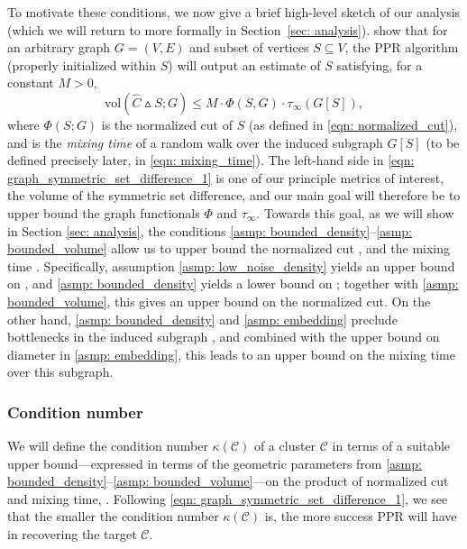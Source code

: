 \documentclass[11pt,twoside]{article}
\theoremstyle{definition}
\newcommand{\vol}{\mathrm{vol}}
\newcommand{\cut}{\mathrm{cut}}
\newcommand{\1}{\mathbbm{1}}
\newcommand{\Xbf}{X}
\newcommand{\Cset}{\mathcal{C}}
\newcommand{\Csig}{\Cset_{\sigma}}
\newcommand{\Cest}{\widehat{C}}
\begin{document}
To motivate these conditions, we now give a brief high-level sketch
of our analysis (which we will return to more formally in Section~\ref{sec:  
  analysis}).  \citet{zhu2013} show that for an arbitrary graph $G = (V,E)$ and
subset of vertices $S \subseteq V$, the PPR algorithm (properly initialized
within $S$) will output an estimate \smash{$\Cest$} of $S$ satisfying, for a
constant $M>0$, 
\begin{equation}
\label{eqn: graph_symmetric_set_difference_1}
\vol(\Cest \vartriangle S; G) \leq M \cdot \Phi(S,G) \cdot \tau_{\infty}(G[S]),    
\end{equation}
where $\Phi(S;G)$ is the normalized cut of $S$ (as defined in \eqref{eqn:
  normalized_cut}), and  is  the \emph{mixing
  time} of a random walk over the induced subgraph $G[S]$ (to be defined
precisely later, in \eqref{eqn: mixing_time}).  The left-hand side in
\eqref{eqn: graph_symmetric_set_difference_1} is one of our principle metrics
of interest, the volume of the symmetric set difference, and our main goal will 
therefore be to upper bound the graph functionals $\Phi$ and $\tau_{\infty}$.
Towards this goal, as we will show in Section
\ref{sec: analysis}, the conditions \ref{asmp: bounded_density}--\ref{asmp: 
  bounded_volume} allow us to upper bound the normalized cut 
\smash{$\Phi(\Csig[\Xbf]; G_{n,r})$}, and the mixing time 
\smash{$\tau_{\infty}(G_{n,r}[\Csig[\Xbf]])$}. Specifically, assumption 
\ref{asmp: low_noise_density} yields an upper
bound on \smash{$\cut(\Csig[\Xbf]; G_{n,r})$}, and \ref{asmp: bounded_density}
yields a lower bound on \smash{$\vol_{n,r}(\Csig[\Xbf])$}; together with 
\ref{asmp: bounded_volume}, this gives an upper bound on the normalized cut.  On 
the other hand, \ref{asmp: bounded_density} and \ref{asmp: embedding} preclude
bottlenecks in the induced subgraph \smash{$G_{n,r}[\Csig[\Xbf]]$}, and combined
with the upper bound on diameter in \ref{asmp: embedding}, this leads to an upper bound on
the mixing time over this subgraph.

\subsubsection{Condition number} 

We will define the condition number $\kappa(\Cset)$ of a cluster $\Cset$ in 
terms of a suitable upper bound---expressed in terms of the geometric parameters
from \ref{asmp: bounded_density}--\ref{asmp: bounded_volume}---on the product of
normalized cut and mixing time, \smash{$\Phi(\Csig[\Xbf]; G_{n,r}) \cdot
  \tau_{\infty}(G_{n,r}[\Csig[\Xbf]])$}. Following \eqref{eqn:
  graph_symmetric_set_difference_1}, we see that the smaller the condition
number $\kappa(\Cset)$ is, the more success PPR will have in recovering the
target $\Cset$.  
\end{document}
